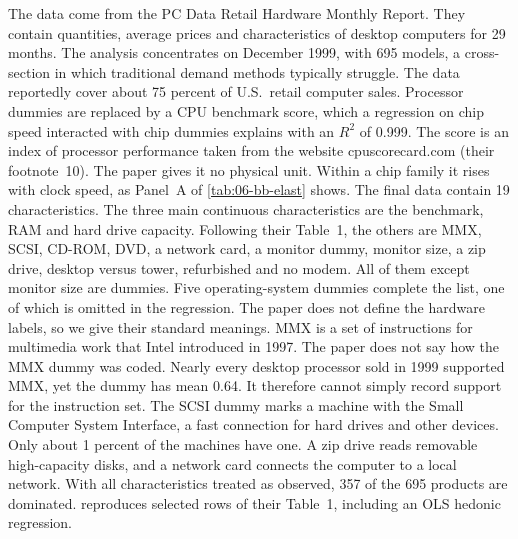 The data come from the PC Data Retail Hardware Monthly Report. They contain quantities, average prices and characteristics of
desktop computers for 29 months. The analysis concentrates on December 1999, with 695 models, a cross-section in which
traditional demand methods typically struggle. The data reportedly cover about 75 percent of U.S.\ retail computer sales.
Processor dummies are replaced by a CPU benchmark score, which a regression on chip speed interacted with chip dummies explains
with an $R^2$ of 0.999. The score is an index of processor performance taken from the website cpuscorecard.com (their
footnote~10). The paper gives it no physical unit. Within a chip family it rises with clock speed, as Panel~A of
\cref{tab:06-bb-elast} shows. The final data contain 19 characteristics. The three main continuous characteristics are the benchmark, RAM
and hard drive capacity. Following their Table~1, the others are MMX, SCSI, CD-ROM, DVD, a network card, a monitor dummy, monitor size, a zip
drive, desktop versus tower, refurbished and no modem. All of them except monitor size are dummies. Five
operating-system dummies complete the list, one of which is omitted in the regression. The paper does not define the
hardware labels, so we give their standard meanings. MMX is a set of instructions for multimedia work that Intel
introduced in 1997. The paper does not say how the MMX dummy was coded. Nearly every desktop processor sold in 1999
supported MMX, yet the dummy has mean 0.64. It therefore cannot simply record support for the instruction set. The SCSI dummy marks a machine with the Small Computer
System Interface, a fast connection for hard drives and other devices. Only about 1 percent of the machines have one.
A zip drive reads removable high-capacity disks, and a network card connects the computer to a local network. With all
characteristics treated as observed, 357 of the 695 products are dominated.
 reproduces selected rows of their Table~1, including an OLS hedonic regression.

